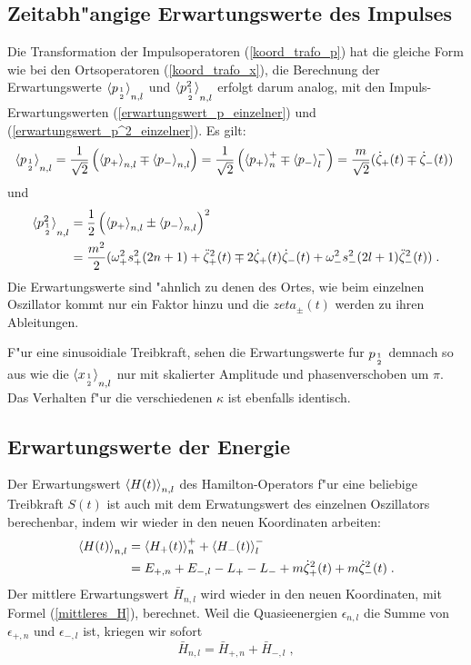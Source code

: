   \subsection{Zeitabh"angige Erwartungswerte des Impulses}
    Die Transformation der Impulsoperatoren (\ref{koord_trafo_p}) hat die gleiche Form wie bei den Ortsoperatoren (\ref{koord_trafo_x}), die Berechnung der Erwartungswerte $\braket{p_{1 \atop 2}}_{n,l}$ und $\braket{p_{1\atop 2}^2}_{n,l}$ erfolgt darum analog, mit den Impuls-Erwartungswerten (\ref{erwartungswert_p_einzelner}) und (\ref{erwartungswert_p^2_einzelner}).
    Es gilt:
    \begin{align}
      \braket{p_{1 \atop 2}}_{n,l}=\frac{1}{\sqrt{2}}\left(\braket{p_+}_{n,l}\mp\braket{p_-}_{n,l}\right)
      =\frac{1}{\sqrt{2}}\left(\braket{p_+}_n^+\mp\braket{p_-}_l^-\right)
      =\frac{m}{\sqrt{2}}(\dot\zeta_+(t)\mp\dot\zeta_-(t)) \;
    \end{align}
    und
    \begin{align}
      \braket{p^2_{1\atop 2}}_{n,l}&=\frac{1}{2}\left(\braket{p_+}_{n,l}\pm\braket{p_-}_{n,l}\right)^2 \notag\\
      &=\frac {m^2} 2 (\omega_+^2s_+^2(2n+1)+\ddot\zeta_+^2(t) \mp 2\dot\zeta_+(t)\dot\zeta_-(t) + \omega_-^2s_-^2(2l+1)\ddot\zeta_-^2(t)) \; .
    \end{align}
    Die Erwartungswerte sind "ahnlich zu denen des Ortes, wie beim einzelnen Oszillator kommt nur ein Faktor hinzu und die $zeta_\pm(t)$ werden zu ihren Ableitungen.

    F"ur eine sinusoidiale Treibkraft, sehen die Erwartungswerte fur $p_{1\atop 2}$ demnach so aus wie die $\braket{x_{1\atop 2}}_{n,l}$ nur mit skalierter Amplitude und phasenverschoben um $\pi$.
    Das Verhalten f"ur die verschiedenen $\kappa$ ist ebenfalls identisch.

  \subsection{Erwartungswerte der Energie}
    Der Erwartungswert $\braket{H(t)}_{n,l}$ des Hamilton-Operators f"ur eine beliebige Treibkraft $S(t)$ ist auch mit dem Erwatungswert des einzelnen Oszillators berechenbar, indem wir wieder in den neuen Koordinaten arbeiten:
    \begin{align}
      \braket{H(t)}_{n,l} &= \braket{H_+(t)}_n^+ + \braket{H_-(t)}_l^- \notag\\
      &= E_{+,n}+E_{-,l} -L_+-L_- +m\dot\zeta_+^2(t)+m\dot\zeta_-^2(t) \; .
    \end{align}
    Der mittlere Erwartungswert $\bar H_{n,l}$ wird wieder in den neuen Koordinaten, mit Formel (\ref{mittleres_H}), berechnet.
    Weil die Quasieenergien $\epsilon_{n,l}$ die Summe von $\epsilon_{+,n}$ und $\epsilon_{-,l}$ ist, kriegen wir sofort
    \begin{equation}
      \bar H_{n,l}=\bar H_{+,n}+\bar H_{-,l} \; ,
    \end{equation}

